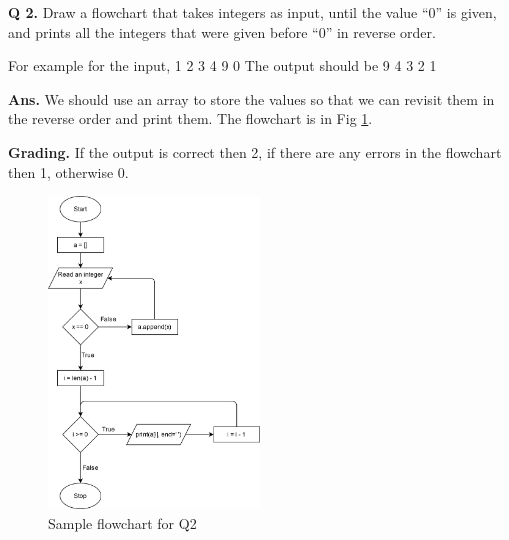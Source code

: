 \documentclass{article}
\begin{document}
\begin{flushleft}

\textbf{Q 2. } Draw a flowchart that takes integers as input, until the value “0” is given, and prints all 
the integers that were given before “0” in reverse order.

For example for the input,
    1 2 3 4 9 0
The output should be 
    9 4 3 2 1
\end{flushleft}

\begin{flushleft}

\textbf{Ans. } We should use an array to store the values so that we can revisit them in the reverse order 
and print them. The flowchart is in Fig \ref{Q2}.

\end{flushleft}

\begin{flushleft}

\textbf{Grading. } If the output is correct then 2, if there are any errors in the flowchart then 1,
otherwise 0.

\end{flushleft}

\begin{figure}[ht]
    \centering
    \includegraphics[width=0.5\textwidth]{Q2.png}
    \caption{Sample flowchart for Q2}
    \label{Q2}
\end{figure}

\clearpage
\end{document}
